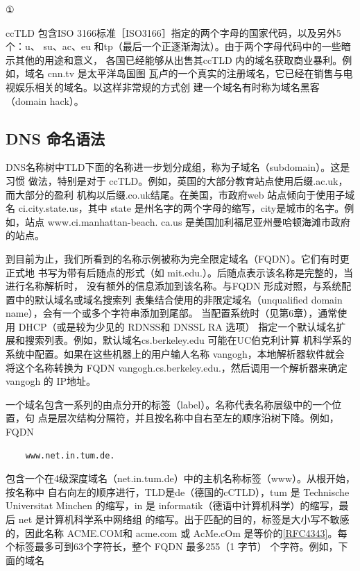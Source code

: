 ① 

ccTLD 包含ISO 3166标准［ISO3166］指定的两个字母的国家代码，以及另外5个：u、
su、ac、eu 和tp（最后一个正逐渐淘汰）。由于两个字母代码中的一些暗示其他的用途和意义，
各国已经能够从出售其ccTLD 内的域名获取商业暴利。例如，域名 cnn.tv 是太平洋岛国图
瓦卢的一个真实的注册域名，它已经在销售与电视娱乐相关的域名。以这样非常规的方式创
建一个域名有时称为域名黑客（domain hack）。

\subsection{DNS 命名语法}

DNS名称树中TLD下面的名称进一步划分成组，称为子域名（subdomain）。这是习惯
做法，特别是对于 ccTLD。例如，英国的大部分教育站点使用后缀.ac.uk，而大部分的盈利
机构以后缀.co.uk结尾。在美国，市政府web 站点倾向于使用子域名 ci.city.state.us，其中
state 是州名字的两个字母的缩写，city是城市的名字。例如，站点 www.ci.manhattan-beach.
ca.us 是美国加利福尼亚州曼哈顿海滩市政府的站点。

到目前为止，我们所看到的名称示例被称为完全限定域名（FQDN）。它们有时更正式地
书写为带有后随点的形式（如 mit.edu.）。后随点表示该名称是完整的，当进行名称解析时，
没有额外的信息添加到该名称。与FQDN 形成对照，与系统配置中的默认域名或域名搜索列
表集结合使用的非限定域名（unqualified domain name），会有一个或多个字符串添加到尾部。
当配置系统时（见第6章），通常使用 DHCP（或是较为少见的 RDNSS和 DNSSL RA 选项）
指定一个默认域名扩展和搜索列表。例如，默认域名cs.berkeley.edu 可能在UC伯克利计算
机科学系的系统中配置。如果在这些机器上的用户输人名称 vangogh，本地解析器软件就会
将这个名称转换为 FQDN vangogh.cs.berkeley.edu.，然后调用一个解析器来确定 vangogh 的
IP地址。

一个域名包含一系列的由点分开的标签（label）。名称代表名称层级中的一个位置，句
点是层次结构分隔符，并且按名称中自右至左的顺序沿树下降。例如，FQDN

\begin{verbatim}
    www.net.in.tum.de.
\end{verbatim}

包含一个在4级深度域名（net.in.tum.de）中的主机名称标签（www）。从根开始，按名称中
自右向左的顺序进行，TLD是de（德国的cCTLD），tum 是 Technische Universitat Minchen
的缩写，in 是 informatik（德语中计算机科学）的缩写，最后 net 是计算机科学系中网络组
的缩写。出于匹配的目的，标签是大小写不敏感的，因此名称 ACME.COM和 acme.com 或
AcMe.cOm 是等价的\href{https://www.rfc-editor.org/rfc/rfc4343}{[RFC4343]}。每个标签最多可到63个字符长，整个 FQDN 最多255（1
字节） 个字符。例如，下面的域名

